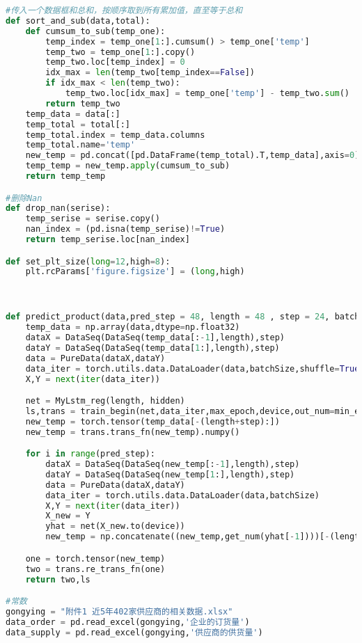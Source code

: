 \begin{appendices}
\begin{lstlisting}[language=python]
#传入一个数据框和总和，按顺序取到所有累加值，直至等于总和
def sort_and_sub(data,total):
    def cumsum_to_sub(temp_one):
        temp_index = temp_one[1:].cumsum() > temp_one['temp']
        temp_two = temp_one[1:].copy()
        temp_two.loc[temp_index] = 0
        idx_max = len(temp_two[temp_index==False])
        if idx_max < len(temp_two):
            temp_two.loc[idx_max] = temp_one['temp'] - temp_two.sum()
        return temp_two
    temp_data = data[:]
    temp_total = total[:]
    temp_total.index = temp_data.columns
    temp_total.name='temp'
    new_temp = pd.concat([pd.DataFrame(temp_total).T,temp_data],axis=0)
    temp_temp = new_temp.apply(cumsum_to_sub)
    return temp_temp

#删除Nan
def drop_nan(serise):
    temp_serise = serise.copy()
    nan_index = (pd.isna(temp_serise)!=True)
    return temp_serise.loc[nan_index]

def set_plt_size(long=12,high=8):
    plt.rcParams['figure.figsize'] = (long,high)



def predict_product(data,pred_step = 48, length = 48 , step = 24, batchSize = 12, hidden = 256 , max_epoch = 1000, min_epoch = 150, device = 'cpu',show_pic = True):
    temp_data = np.array(data,dtype=np.float32)
    dataX = DataSeq(DataSeq(temp_data[:-1],length),step)
    dataY = DataSeq(DataSeq(temp_data[1:],length),step)
    data = PureData(dataX,dataY)
    data_iter = torch.utils.data.DataLoader(data,batchSize,shuffle=True)
    X,Y = next(iter(data_iter))

    net = MyLstm_reg(length, hidden)
    ls,trans = train_begin(net,data_iter,max_epoch,device,out_num=min_epoch,show_pic=show_pic)
    new_temp = torch.tensor(temp_data[-(length+step):])
    new_temp = trans.trans_fn(new_temp).numpy()

    for i in range(pred_step):
        dataX = DataSeq(DataSeq(new_temp[:-1],length),step)
        dataY = DataSeq(DataSeq(new_temp[1:],length),step)
        data = PureData(dataX,dataY)
        data_iter = torch.utils.data.DataLoader(data,batchSize)
        X,Y = next(iter(data_iter))
        X_new = Y
        yhat = net(X_new.to(device))
        new_temp = np.concatenate((new_temp,get_num(yhat[-1])))[-(length+step):]

    one = torch.tensor(new_temp)
    two = trans.re_trans_fn(one)
    return two,ls

#常数
gongying = "附件1 近5年402家供应商的相关数据.xlsx"
data_order = pd.read_excel(gongying,'企业的订货量')
data_supply = pd.read_excel(gongying,'供应商的供货量')


\end{lstlisting}
\end{appendices}
